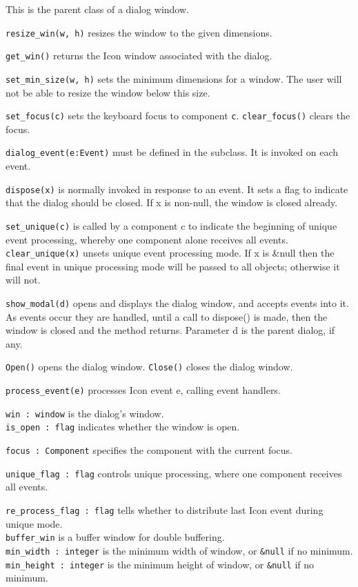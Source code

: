 This is the parent class of a dialog window.

\noindent\texttt{resize\_win(w, h)} resizes the window to the given dimensions.

\noindent\texttt{get\_win()} returns the Icon window associated with the dialog.

\noindent\texttt{set\_min\_size(w, h)} sets the minimum dimensions for a window. The user
will not be able to resize the window below this size.

\noindent\texttt{set\_focus(c)} sets the keyboard focus to component \texttt{c}.
\texttt{clear\_focus()} clears the focus.

\noindent\texttt{dialog\_event(e:Event)} must be defined in the subclass. It is
invoked on each event.

\noindent\texttt{dispose(x)} is normally invoked in response to an event.
It sets a
flag to indicate that the dialog should be closed. If x is non-null,
the window is closed already.

\noindent\texttt{set\_unique(c)} is called by a component c to indicate the beginning of
unique event processing, whereby one component alone receives all
events.\\
\texttt{clear\_unique(x)} unsets unique event processing mode. If x is \&null
then the final event in unique processing mode will be passed to all
objects; otherwise it will not.

\texttt{show\_modal(d)} opens and displays the dialog window, and accepts events
into it. As events occur they are handled, until a call to dispose()
is made, then the window is closed and the method returns. Parameter d
is the parent dialog, if any.

\texttt{Open()} opens the dialog window.
\texttt{Close()} closes the dialog window.

\texttt{process\_event(e)} processes Icon event e, calling event handlers.

\texttt{win : window} is the dialog's window.\\
\texttt{is\_open : flag} indicates whether the window is open.

\texttt{focus : Component} specifies the component with the current focus.

\texttt{unique\_flag : flag} controls unique processing, where one
component receives all events.

\texttt{re\_process\_flag : flag} tells whether to distribute last
Icon event during unique mode.\\
\texttt{buffer\_win} is a buffer window for double buffering.\\
\texttt{min\_width : integer} is the minimum width of window, or \texttt{\&null} if no
minimum.\\
\texttt{min\_height : integer} is the minimum height of window, or \texttt{\&null} if no
minimum.

